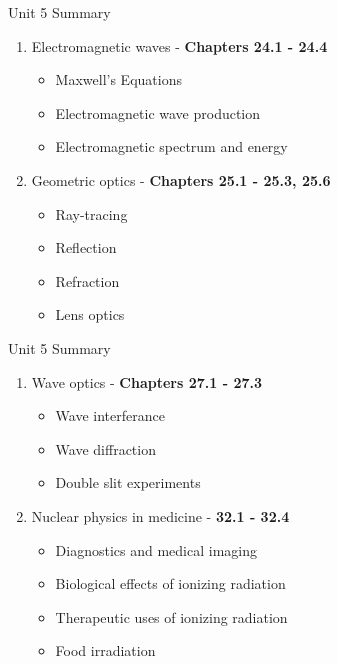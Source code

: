 \documentclass{beamer}
\begin{document}
\begin{frame}{Unit 5 Summary}
\begin{enumerate}
\item Electromagnetic waves - \textbf{Chapters 24.1 - 24.4}
\begin{itemize}
\item Maxwell's Equations
\item Electromagnetic wave production
\item Electromagnetic spectrum and energy
\end{itemize}
\item Geometric optics - \textbf{Chapters 25.1 - 25.3, 25.6}
\begin{itemize}
\item Ray-tracing
\item Reflection
\item Refraction
\item Lens optics
\end{itemize}
\end{enumerate}
\end{frame}

\begin{frame}{Unit 5 Summary}
\begin{enumerate}
\item Wave optics - \textbf{Chapters 27.1 - 27.3}
\begin{itemize}
\item Wave interferance
\item Wave diffraction
\item Double slit experiments
\end{itemize}
\item Nuclear physics in medicine - \textbf{32.1 - 32.4}
\begin{itemize}
\item Diagnostics and medical imaging
\item Biological effects of ionizing radiation
\item Therapeutic uses of ionizing radiation
\item Food irradiation
\end{itemize}
\end{enumerate}
\end{frame}
\end{document}
